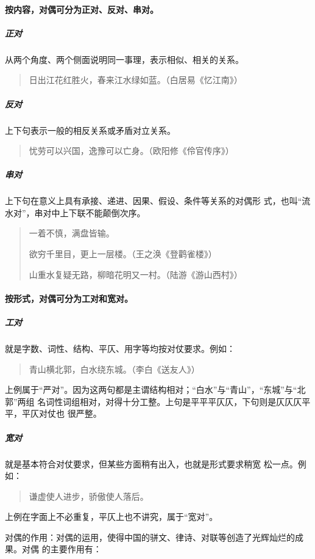 \documentclass[final,oneside]{ctexbook}
\newenvironment{equotation}{\begin{quotation}\kaishu}{\end{quotation}}
\begin{document}
\paragraph{按内容，对偶可分为正对、反对、串对。}

\subparagraph{正对}从两个角度、两个侧面说明同一事理，表示相似、相关的关系。

\begin{equotation}
  日出江花红胜火，春来江水绿如蓝。（白居易《忆江南》）
\end{equotation}

\subparagraph{反对}上下句表示一般的相反关系或矛盾对立关系。

\begin{equotation}
  忧劳可以兴国，逸豫可以亡身。（欧阳修《伶官传序》）
\end{equotation}

\subparagraph{串对}上下句在意义上具有承接、递进、因果、假设、条件等关系的对偶形
式，也叫“流水对”，串对中上下联不能颠倒次序。

\begin{equotation}
  一着不慎，满盘皆输。

  欲穷千里目，更上一层楼。（王之涣《登鹳雀楼》）

  山重水复疑无路，柳暗花明又一村。（陆游《游山西村》）
\end{equotation}

\paragraph{按形式，对偶可分为工对和宽对。}

\subparagraph{工对}就是字数、词性、结构、平仄、用字等均按对仗要求。例如：

\begin{equotation}
  青山横北郭，白水绕东城。（李白《送友人》）
\end{equotation}
上例属于“严对”。因为这两句都是主谓结构相对；“白水”与“青山”，“东城”与“北郭”两组
名词性词组相对，对得十分工整。上句是平平平仄仄，下句则是仄仄仄平平，平仄对仗也
很严整。

\subparagraph{宽对}就是基本符合对仗要求，但某些方面稍有出入，也就是形式要求稍宽
松一点。例如：

\begin{equotation}
  谦虚使人进步，骄傲使人落后。
\end{equotation}
上例在字面上不必重复，平仄上也不讲究，属于“宽对”。

对偶的作用：对偶的运用，使得中国的骈文、律诗、对联等创造了光辉灿烂的成果。对偶
的主要作用有：
\end{document}
